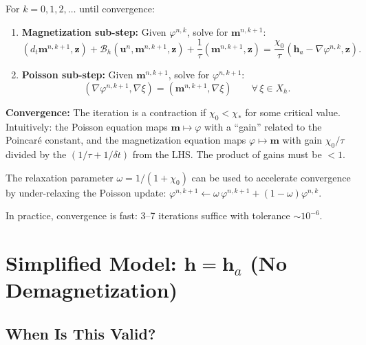 \documentclass[11pt,a4paper]{article}
\theoremstyle{definition}
\theoremstyle{remark}
\newcommand{\grad}{\nabla}
\newcommand{\bfu}{\bm{u}}
\newcommand{\bfm}{\bm{m}}
\newcommand{\bfh}{\bm{h}}
\newcommand{\bfz}{\bm{z}}
\begin{document}
For $k = 0, 1, 2, \ldots$ until convergence:
\begin{enumerate}
  \item \textbf{Magnetization sub-step:} Given $\varphi^{n,k}$, solve for
        $\bfm^{n,k+1}$:
        \begin{equation}
          \label{eq:picard-mag}
          (d_t\bfm^{n,k+1}, \bfz)
          + \mathcal{B}_h(\bfu^n, \bfm^{n,k+1}, \bfz)
          + \frac{1}{\tau}(\bfm^{n,k+1}, \bfz)
          = \frac{\chi_0}{\tau}(\bfh_a - \grad\varphi^{n,k}, \bfz).
        \end{equation}

  \item \textbf{Poisson sub-step:} Given $\bfm^{n,k+1}$, solve for
        $\varphi^{n,k+1}$:
        \begin{equation}
          \label{eq:picard-poisson}
          (\grad\varphi^{n,k+1}, \grad\xi) = (\bfm^{n,k+1}, \grad\xi)
          \qquad \forall\,\xi \in X_h.
        \end{equation}
\end{enumerate}

\begin{derivnote}
\textbf{Convergence:} The iteration is a contraction if
$\chi_0 < \chi_*$ for some critical value. Intuitively: the Poisson
equation maps $\bfm \mapsto \varphi$ with a ``gain'' related to the
Poincar\'e constant, and the magnetization equation maps
$\varphi \mapsto \bfm$ with gain $\chi_0/\tau$ divided by the
$(1/\tau + 1/\delta t)$ from the LHS. The product of gains must be $< 1$.

The relaxation parameter $\omega = 1/(1+\chi_0)$ can be used to
accelerate convergence by under-relaxing the Poisson update:
$\varphi^{n,k+1} \leftarrow \omega\,\varphi^{n,k+1} + (1-\omega)\varphi^{n,k}$.

In practice, convergence is fast: 3--7 iterations suffice with tolerance
$\sim 10^{-6}$.
\end{derivnote}


\section{Simplified Model: \texorpdfstring{$\bfh = \bfh_a$}{h = h\_a} (No Demagnetization)}
\label{sec:simplified}

\subsection{When Is This Valid?}
\end{document}

